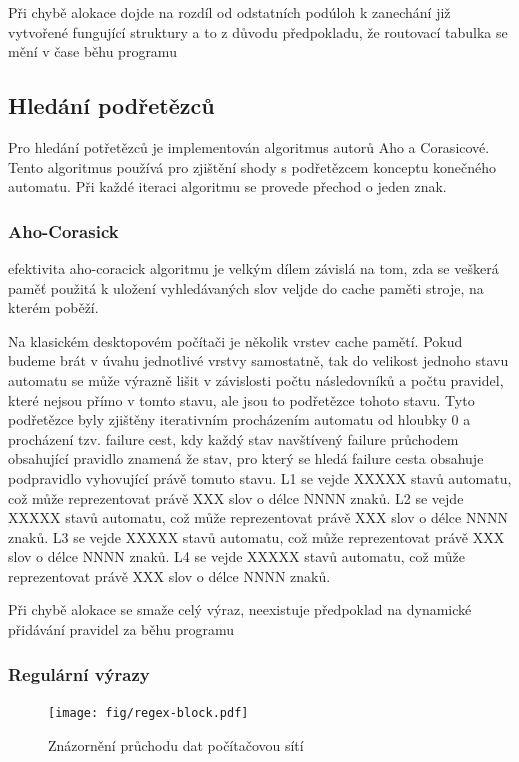 Při chybě alokace dojde na rozdíl od odstatních podúloh k zanechání již vytvořené fungující struktury
a to z důvodu předpokladu, že routovací tabulka se mění v čase běhu programu

\subsection{Hledání podřetězců}
Pro hledání potřetězců je implementován algoritmus autorů Aho a Corasicové. Tento algoritmus používá pro zjištění shody s podřetězcem konceptu konečného automatu. Při každé iteraci algoritmu se provede přechod o jeden znak.

\subsubsection{Aho-Corasick}
efektivita aho-coracick algoritmu je velkým dílem závislá na tom, zda se veškerá paměť použitá k uložení vyhledávaných slov veljde do cache paměti stroje, na kterém poběží.

Na klasickém desktopovém počítači je několik vrstev cache pamětí.
Pokud budeme brát v úvahu jednotlivé vrstvy samostatně, tak do
velikost jednoho stavu automatu se může výrazně lišit v závislosti počtu následovníků a počtu
pravidel, které nejsou přímo v tomto stavu, ale jsou to podřetězce tohoto stavu.
Tyto podřetězce byly zjištěny iterativním procházením automatu od hloubky 0 a procházení tzv. failure cest, kdy každý stav navštívený failure průchodem obsahující pravidlo znamená že stav, pro který se hledá failure cesta obsahuje podpravidlo vyhovující právě tomuto stavu.
L1 se vejde XXXXX stavů automatu, což může reprezentovat právě XXX slov o délce NNNN znaků.
L2 se vejde XXXXX stavů automatu, což může reprezentovat právě XXX slov o délce NNNN znaků.
L3 se vejde XXXXX stavů automatu, což může reprezentovat právě XXX slov o délce NNNN znaků.
L4 se vejde XXXXX stavů automatu, což může reprezentovat právě XXX slov o délce NNNN znaků.

Při chybě alokace se smaže celý výraz, neexistuje předpoklad na dynamické přidávání pravidel za běhu programu

\subsubsection{Regulární výrazy}

\begin{figure}[!htb]
\centering
\texttt{[image: fig/regex-block.pdf]}
\caption{Znázornění průchodu dat počítačovou sítí}
\label{fig:regex-block}
\end{figure}

